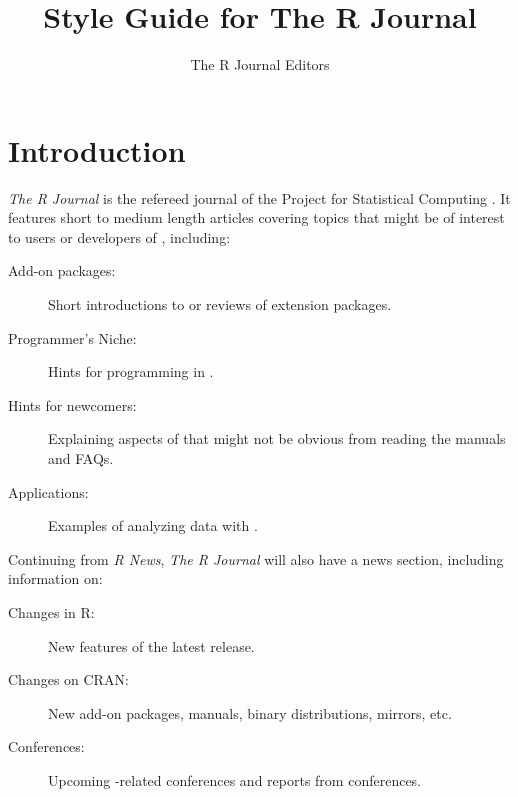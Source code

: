 \title{Style Guide for The R Journal}

\author{The R Journal Editors}

\maketitle


\section{Introduction}

\emph{The R Journal} is the refereed journal of the \R{} Project for Statistical
Computing \citep{R:Ihaka+Gentleman:1996}.
It features short to medium length articles covering topics
that might be of interest to users or developers of \R{}, including:

\begin{description}

\item[Add-on packages:] Short introductions to or reviews of \R{} extension
packages.

\item[Programmer's Niche:] Hints for programming in \R{}.

\item[Hints for newcomers:] Explaining aspects of \R{} that might not be
obvious from reading the manuals and FAQs.

\item[Applications:] Examples of analyzing data with \R{}.

\end{description}

Continuing from \emph{R News}, \emph{The R Journal} will also have a news section,
including information on:

\begin{description}

\item[Changes in R:] New features of the latest release.

\item[Changes on CRAN:] New add-on packages, manuals, binary distributions,
mirrors, etc.

\item[Conferences:] Upcoming \R{}-related conferences and reports from
conferences.

\end{description}

